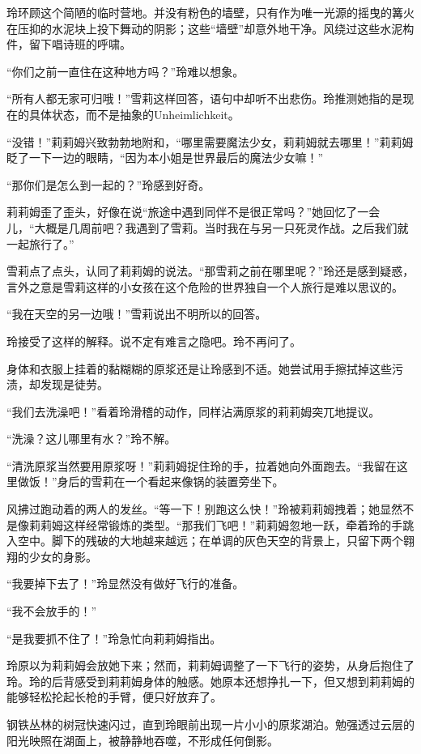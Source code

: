 玲环顾这个简陋的临时营地。并没有粉色的墙壁，只有作为唯一光源的摇曳的篝火在压抑的水泥块上投下舞动的阴影；这些“墙壁”却意外地干净。风绕过这些水泥构件，留下唱诗班的呼啸。

“你们之前一直住在这种地方吗？”玲难以想象。

“所有人都无家可归哦！”雪莉这样回答，语句中却听不出悲伤。玲推测她指的是现在的具体状态，而不是抽象的Unheimlichkeit。

“没错！”莉莉姆兴致勃勃地附和，“哪里需要魔法少女，莉莉姆就去哪里！”莉莉姆眨了一下一边的眼睛，“因为本小姐是世界最后的魔法少女嘛！”

“那你们是怎么到一起的？”玲感到好奇。

莉莉姆歪了歪头，好像在说“旅途中遇到同伴不是很正常吗？”她回忆了一会儿，“大概是几周前吧？我遇到了雪莉。当时我在与另一只死灵作战。之后我们就一起旅行了。”

雪莉点了点头，认同了莉莉姆的说法。“那雪莉之前在哪里呢？”玲还是感到疑惑，言外之意是雪莉这样的小女孩在这个危险的世界独自一个人旅行是难以思议的。

“我在天空的另一边哦！”雪莉说出不明所以的回答。

玲接受了这样的解释。说不定有难言之隐吧。玲不再问了。

身体和衣服上挂着的黏糊糊的原浆还是让玲感到不适。她尝试用手擦拭掉这些污渍，却发现是徒劳。

“我们去洗澡吧！”看着玲滑稽的动作，同样沾满原浆的莉莉姆突兀地提议。

“洗澡？这儿哪里有水？”玲不解。

“清洗原浆当然要用原浆呀！”莉莉姆捉住玲的手，拉着她向外面跑去。“我留在这里做饭！”身后的雪莉在一个看起来像锅的装置旁坐下。

风拂过跑动着的两人的发丝。“等一下！别跑这么快！”玲被莉莉姆拽着；她显然不是像莉莉姆这样经常锻炼的类型。“那我们飞吧！”莉莉姆忽地一跃，牵着玲的手跳入空中。脚下的残破的大地越来越远；在单调的灰色天空的背景上，只留下两个翱翔的少女的身影。

“我要掉下去了！”玲显然没有做好飞行的准备。

“我不会放手的！”

“是我要抓不住了！”玲急忙向莉莉姆指出。

玲原以为莉莉姆会放她下来；然而，莉莉姆调整了一下飞行的姿势，从身后抱住了玲。玲的后背感受到莉莉姆身体的触感。她原本还想挣扎一下，但又想到莉莉姆的能够轻松抡起长枪的手臂，便只好放弃了。

钢铁丛林的树冠快速闪过，直到玲眼前出现一片小小的原浆湖泊。勉强透过云层的阳光映照在湖面上，被静静地吞噬，不形成任何倒影。

